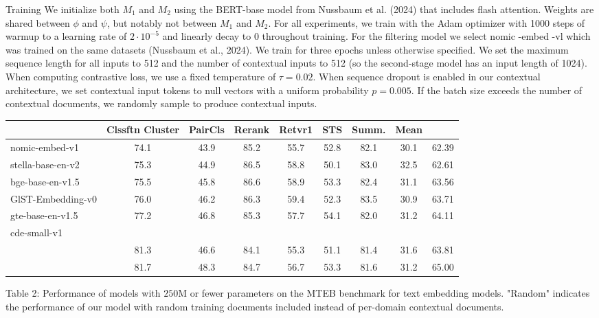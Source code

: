 Training We initialize both \(M_{1}\) and \(M_{2}\) using the BERT-base model from Nussbaum et al. (2024) that includes flash attention. Weights are shared between \(\phi\) and \(\psi\), but notably not between \(M_{1}\) and \(M_{2}\). For all experiments, we train with the Adam optimizer with 1000 steps of warmup to a learning rate of \(2 \cdot 10^{-5}\) and linearly decay to 0 throughout training. For the filtering model we select nomic -embed -vl which was trained on the same datasets (Nussbaum et al., 2024). We train for three epochs unless otherwise specified. We set the maximum sequence length for all inputs to 512 and the number of contextual inputs to 512 (so the second-stage model has an input length of 1024). When computing contrastive loss, we use a fixed temperature of \(\tau=0.02\). When sequence dropout is enabled in our contextual architecture, we set contextual input tokens to null vectors with a uniform probability \(p=0.005\). If the batch size exceeds the number of contextual documents, we randomly sample to produce contextual inputs.

\begin{tabular}{lcccccccc}
\hline & Clssftn Cluster & PairCls & Rerank & Retvr1 & STS & Summ. & Mean \\
\hline nomic-embed-v1 & 74.1 & 43.9 & 85.2 & 55.7 & 52.8 & 82.1 & 30.1 & 62.39 \\
stella-base-en-v2 & 75.3 & 44.9 & 86.5 & 58.8 & 50.1 & 83.0 & 32.5 & 62.61 \\
bge-base-en-v1.5 & 75.5 & 45.8 & 86.6 & 58.9 & 53.3 & 82.4 & 31.1 & 63.56 \\
GlST-Embedding-v0 & 76.0 & 46.2 & 86.3 & 59.4 & 52.3 & 83.5 & 30.9 & 63.71 \\
gte-base-en-v1.5 & 77.2 & 46.8 & 85.3 & 57.7 & 54.1 & 82.0 & 31.2 & 64.11 \\
\hline cde-small-v1 & & & & & & & & \\
[Random] & 81.3 & 46.6 & 84.1 & 55.3 & 51.1 & 81.4 & 31.6 & 63.81 \\
[Contextual] & 81.7 & 48.3 & 84.7 & 56.7 & 53.3 & 81.6 & 31.2 & 65.00 \\
\hline
\end{tabular}
Table 2: Performance of models with \(250 \mathrm{M}\) or fewer parameters on the MTEB benchmark for text embedding models. "Random" indicates the performance of our model with random training documents included instead of per-domain contextual documents.
